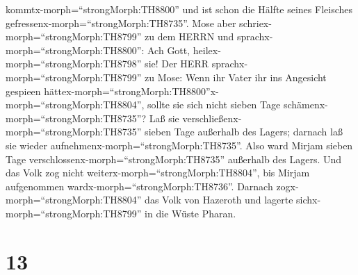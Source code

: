 kommtx-morph=``strongMorph:TH8800'' und ist schon die Hälfte seines
Fleisches gefressenx-morph=``strongMorph:TH8735''.  Mose
aber schriex-morph=``strongMorph:TH8799'' zu dem HERRN und
sprachx-morph=``strongMorph:TH8800'': Ach Gott,
heilex-morph=``strongMorph:TH8798'' sie!  Der HERR
sprachx-morph=``strongMorph:TH8799'' zu Mose: Wenn ihr Vater ihr ins
Angesicht gespieen
hättex-morph=``strongMorph:TH8800''x-morph=``strongMorph:TH8804'',
sollte sie sich nicht sieben Tage schämenx-morph=``strongMorph:TH8735''?
Laß sie verschließenx-morph=``strongMorph:TH8735'' sieben Tage außerhalb
des Lagers; darnach laß sie wieder
aufnehmenx-morph=``strongMorph:TH8735''.  Also ward Mirjam
sieben Tage verschlossenx-morph=``strongMorph:TH8735'' außerhalb des
Lagers. Und das Volk zog nicht weiterx-morph=``strongMorph:TH8804'', bis
Mirjam aufgenommen wardx-morph=``strongMorph:TH8736''. 
Darnach zogx-morph=``strongMorph:TH8804'' das Volk von Hazeroth und
lagerte sichx-morph=``strongMorph:TH8799'' in die Wüste Pharan.

\hypertarget{section-12}{%
\section{13}\label{section-12}}

